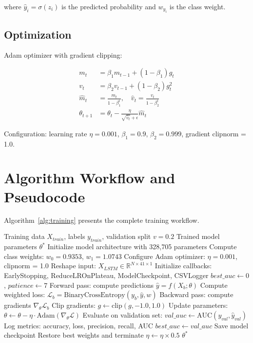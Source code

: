 \documentclass[12pt,a4paper]{report}
\begin{document}
where $\hat{y}_i = \sigma(z_i)$ is the predicted probability and $w_{y_i}$ is the class weight.

\subsection{Optimization}

Adam optimizer with gradient clipping:

\begin{align}
    m_t &= \beta_1 m_{t-1} + (1-\beta_1) g_t \\
    v_t &= \beta_2 v_{t-1} + (1-\beta_2) g_t^2 \\
    \hat{m}_t &= \frac{m_t}{1-\beta_1^t}, \quad \hat{v}_t = \frac{v_t}{1-\beta_2^t} \\
    \theta_{t+1} &= \theta_t - \frac{\eta}{\sqrt{\hat{v}_t} + \epsilon} \hat{m}_t
\end{align}

Configuration: learning rate $\eta = 0.001$, $\beta_1 = 0.9$, $\beta_2 = 0.999$, gradient clipnorm = 1.0.

\section{Algorithm Workflow and Pseudocode}

Algorithm~\ref{alg:training} presents the complete training workflow.

\begin{algorithm}[H]
\caption{Bidirectional LSTM Training Workflow}
\label{alg:training}
\begin{algorithmic}[1]
\Require Training data $X_{train}$, labels $y_{train}$, validation split $v=0.2$
\Ensure Trained model parameters $\theta^*$
\State Initialize model architecture with 328,705 parameters
\State Compute class weights: $w_0 = 0.9353$, $w_1 = 1.0743$
\State Configure Adam optimizer: $\eta = 0.001$, clipnorm = 1.0
\State Reshape input: $X_{LSTM} \in \mathbb{R}^{N \times 41 \times 1}$
\State Initialize callbacks: EarlyStopping, ReduceLROnPlateau, ModelCheckpoint, CSVLogger
\State $best\_auc \leftarrow 0$, $patience \leftarrow 7$
        \State Forward pass: compute predictions $\hat{y} = f(X_b; \theta)$
        \State Compute weighted loss: $\mathcal{L}_b = \text{BinaryCrossEntropy}(y_b, \hat{y}, w)$
        \State Backward pass: compute gradients $\nabla_\theta \mathcal{L}_b$
        \State Clip gradients: $g \leftarrow \text{clip}(g, -1.0, 1.0)$
        \State Update parameters: $\theta \leftarrow \theta - \eta \cdot \text{Adam}(\nabla_\theta \mathcal{L})$
    \EndFor
    \State Evaluate on validation set: $val\_auc \leftarrow \text{AUC}(y_{val}, \hat{y}_{val})$
    \State Log metrics: accuracy, loss, precision, recall, AUC
        \State $best\_auc \leftarrow val\_auc$
        \State Save model checkpoint
    \EndIf
        \State Restore best weights and terminate
    \EndIf
        \State $\eta \leftarrow \eta \times 0.5$
    \EndIf
\EndFor
\State \Return $\theta^*$
\end{algorithmic}
\end{algorithm}
\end{document}
